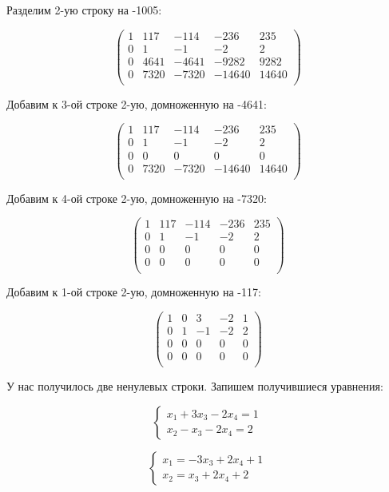 	Разделим 2-ую строку на -1005:
	
	\[
	\begin{pmatrix}
	1 & 117 & -114 & -236 & 235 \\
	0 & 1 & -1 & -2 & 2 \\
	0 & 4641 & -4641 & -9282 & 9282 \\
	0 & 7320 & -7320 & -14640 & 14640 \\
	\end{pmatrix}
	\]
	
	Добавим к 3-ой строке 2-ую, домноженную на -4641:
	
	\[
	\begin{pmatrix}
	1 & 117 & -114 & -236 & 235 \\
	0 & 1 & -1 & -2 & 2 \\
	0 & 0 & 0 & 0 & 0 \\
	0 & 7320 & -7320 & -14640 & 14640 \\
	\end{pmatrix}
	\]
	
	Добавим к 4-ой строке 2-ую, домноженную на -7320:
	
	\[
	\begin{pmatrix}
	1 & 117 & -114 & -236 & 235 \\
	0 & 1 & -1 & -2 & 2 \\
	0 & 0 & 0 & 0 & 0 \\
	0 & 0 & 0 & 0 & 0 \\
	\end{pmatrix}
	\]
	
	Добавим к 1-ой строке 2-ую, домноженную на -117:
	
	\[
	\begin{pmatrix}
	1 & 0 & 3 & -2 & 1 \\
	0 & 1 & -1 & -2 & 2 \\
	0 & 0 & 0 & 0 & 0 \\
	0 & 0 & 0 & 0 & 0 \\
	\end{pmatrix}
	\]
	
	У нас получилось две ненулевых строки. 
	Запишем получившиеся уравнения:
	
	\[
		\begin{cases}
		x_1 + 3x_3 - 2x_4 = 1 \\
		x_2 - x_3 - 2x_4 = 2
		\end{cases}
	\]
	
	\[
	\begin{cases}
		x_1 = -3x_3 + 2x_4 + 1 \\
		x_2 = x_3 + 2x_4 +2
	\end{cases}
	\]
	
